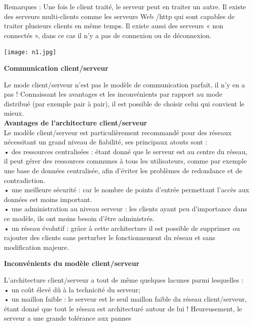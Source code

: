 \documentclass[12pt, openany]{report}
\begin{document}
Remarques : Une fois le client traité, le serveur peut en traiter un autre. Il existe des serveurs multi-clients comme les serveurs Web /http qui sont capables de traiter plusieurs clients en même temps. Il existe aussi des serveurs « non connectés », dans ce cas il n’y a pas de connexion ou de déconnexion.
\begin{center}
\texttt{[image: n1.jpg]}~\\[1.5cm]
\end{center}
\newpage
\begin{center}
\textbf{Communication client/serveur }\\
\end{center}
Le mode client/serveur n’est pas le modèle de communication parfait, il n’y en a pas ! Connaissant les avantages et les inconvénients par rapport au mode distribué (par exemple pair à pair), il est possible de choisir celui qui convient le mieux.\\
\textbf{Avantages de l'architecture client/serveur}\\
Le modèle client/serveur est particulièrement recommandé pour des réseaux nécessitant un grand niveau de fiabilité, ses principaux atouts sont :\\
    • des ressources centralisées : étant donné que le serveur est au centre du réseau, il peut gérer des ressources communes à tous les utilisateurs, comme par exemple une base de données centralisée, afin d'éviter les problèmes de redondance et de contradiction.\\
    • une meilleure sécurité : car le nombre de points d'entrée permettant l'accès aux données est moins important.\\
    • une administration au niveau serveur : les clients ayant peu d'importance dans ce modèle, ils ont moins besoin d'être administrés.\\
    • un réseau évolutif : grâce à cette architecture il est possible de supprimer ou rajouter des clients sans perturber le fonctionnement du réseau et sans modification majeure.
    \begin{center}
\textbf{Inconvénients du modèle client/serveur }\\
\end{center}
L'architecture client/serveur a tout de même quelques lacunes parmi lesquelles :\\
    • un coût élevé dû à la technicité du serveur;\\
    • un maillon faible : le serveur est le seul maillon faible du réseau client/serveur, étant donné que tout le réseau est architecturé autour de lui ! Heureusement, le serveur a une grande tolérance aux pannes
    
\end{document}
